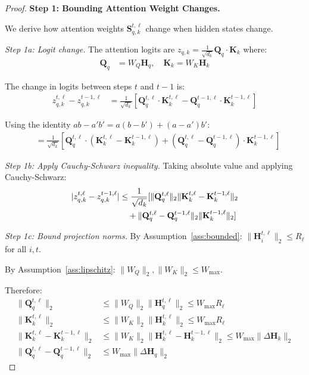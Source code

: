 \documentclass{article} %
\theoremstyle{definition}
\theoremstyle{remark}
\begin{document}
\begin{proof}

\textbf{Step 1: Bounding Attention Weight Changes.}

We derive how attention weights $\mathbf{S}^{t,\ell}_{q,k}$ change when hidden states change.

\textit{Step 1a: Logit change.}
The attention logits are $z_{q,k} = \frac{1}{\sqrt{d_k}} \mathbf{Q}_q \cdot \mathbf{K}_k$ where:
\begin{align}
\mathbf{Q}_q &= W_Q \mathbf{H}_q, \quad \mathbf{K}_k = W_K \mathbf{H}_k
\end{align}

The change in logits between steps $t$ and $t-1$ is:
\begin{align}
z^{t,\ell}_{q,k} - z^{t-1,\ell}_{q,k} &= \frac{1}{\sqrt{d_k}}[\mathbf{Q}^{t,\ell}_q \cdot \mathbf{K}^{t,\ell}_k - \mathbf{Q}^{t-1,\ell}_q \cdot \mathbf{K}^{t-1,\ell}_k]
\end{align}

Using the identity $ab - a'b' = a(b-b') + (a-a')b'$:
\begin{align}
&= \frac{1}{\sqrt{d_k}}[\mathbf{Q}^{t,\ell}_q \cdot (\mathbf{K}^{t,\ell}_k - \mathbf{K}^{t-1,\ell}_k) + (\mathbf{Q}^{t,\ell}_q - \mathbf{Q}^{t-1,\ell}_q) \cdot \mathbf{K}^{t-1,\ell}_k]
\end{align}

\textit{Step 1b: Apply Cauchy-Schwarz inequality.}
Taking absolute value and applying Cauchy-Schwarz:
\begin{align}
|z^{t,\ell}_{q,k} - z^{t-1,\ell}_{q,k}| &\leq \frac{1}{\sqrt{d_k}}[\|\mathbf{Q}^{t,\ell}_q\|_2 \|\mathbf{K}^{t,\ell}_k - \mathbf{K}^{t-1,\ell}_k\|_2 \notag\\
&\quad + \|\mathbf{Q}^{t,\ell}_q - \mathbf{Q}^{t-1,\ell}_q\|_2 \|\mathbf{K}^{t-1,\ell}_k\|_2]
\end{align}

\textit{Step 1c: Bound projection norms.}
By Assumption~\ref{ass:bounded}: $\|\mathbf{H}^{t,\ell}_i\|_2 \leq R_\ell$ for all $i,t$.

By Assumption~\ref{ass:lipschitz}: $\|W_Q\|_2, \|W_K\|_2 \leq W_{\max}$.

Therefore:
\begin{align}
\|\mathbf{Q}^{t,\ell}_q\|_2 &\leq \|W_Q\|_2 \|\mathbf{H}^{t,\ell}_q\|_2 \leq W_{\max} R_\ell\\
\|\mathbf{K}^{t,\ell}_k\|_2 &\leq \|W_K\|_2 \|\mathbf{H}^{t,\ell}_k\|_2 \leq W_{\max} R_\ell\\
\|\mathbf{K}^{t,\ell}_k - \mathbf{K}^{t-1,\ell}_k\|_2 &\leq \|W_K\|_2 \|\mathbf{H}^{t,\ell}_k - \mathbf{H}^{t-1,\ell}_k\|_2 \leq W_{\max} \|\Delta\mathbf{H}_k\|_2\\
\|\mathbf{Q}^{t,\ell}_q - \mathbf{Q}^{t-1,\ell}_q\|_2 &\leq W_{\max} \|\Delta\mathbf{H}_q\|_2
\end{align}


\end{proof}
\end{document}
